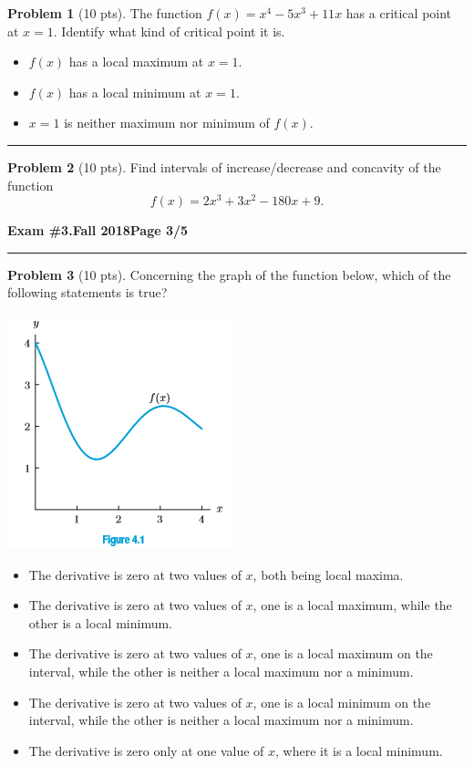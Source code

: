\documentclass[12pt]{article}
\makeatletter
\theoremstyle{definition}
\newtheorem{problem}{Problem}
\newcommand*{\radiobutton}{%
  \@ifstar{\@radiobutton0}{\@radiobutton1}%
}
\newcommand*{\@radiobutton}[1]{%
  \begin{tikzpicture}
    \pgfmathsetlengthmacro\radius{height("X")/2}
    \draw[radius=\radius] circle;
    \ifcase#1 \fill[radius=.6*\radius] circle;\fi
  \end{tikzpicture}%
}
\makeatother
\begin{document}
\bigskip
\begin{problem}[10 pts]
The function $f(x) = x^4 - 5x^3 + 11x$ has a critical point at $x=1$.  Identify what kind of critical point it is.
\begin{itemize}
\item[\radiobutton] $f(x)$ has a local maximum at $x=1$.
\item[\radiobutton] $f(x)$ has a local minimum at $x=1$.
\item[\radiobutton] $x=1$ is neither maximum nor minimum of $f(x)$.
\end{itemize}
\end{problem}
\vspace{5cm}
\hrule
\begin{problem}[10 pts]
  Find intervals of increase/decrease and concavity of the function
  \begin{equation*}
    f(x) = 2x^3 + 3x^2-180x+9.
  \end{equation*}
\end{problem}
\newpage

\hfill{\large\bf Exam \#3.}\hfill{\large\bf Fall 2018}\hfill{\large\bf Page 3/5}\hrule

\bigskip
\begin{problem}[10 pts]
Concerning the graph of the function below, which of the following statements is true?
\begin{center}
\includegraphics{3graph3}
\end{center}
\begin{itemize}
\item[\radiobutton] The derivative is zero at two values of $x$, both being local maxima.
\item[\radiobutton] The derivative is zero at two values of $x$, one is a local maximum, while the other is a local minimum.
\item[\radiobutton] The derivative is zero at two values of $x$, one is a local maximum on the interval, while the other is neither a local maximum nor a minimum.
\item[\radiobutton] The derivative is zero at two values of $x$, one is a local minimum on the interval, while the other is neither a local maximum nor a minimum.
\item[\radiobutton] The derivative is zero only at one value of $x$, where it is a local minimum.
\end{itemize}
\end{problem}
\end{document}

